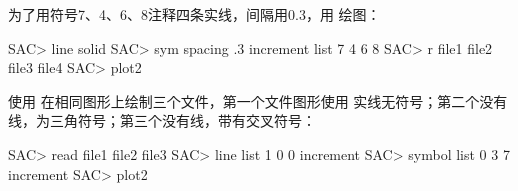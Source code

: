 为了用符号7、4、6、8注释四条实线，间隔用0.3，用  绘图：
\begin{SACCode}
SAC> line solid
SAC> sym spacing .3 increment list 7 4 6 8
SAC> r file1 file2 file3 file4
SAC> plot2
\end{SACCode}

使用  在相同图形上绘制三个文件，第一个文件图形使用
实线无符号；第二个没有线，为三角符号；第三个没有线，带有交叉符号：
\begin{SACCode}
SAC> read file1 file2 file3
SAC> line list 1 0 0 increment
SAC> symbol list 0 3 7 increment
SAC> plot2
\end{SACCode}
